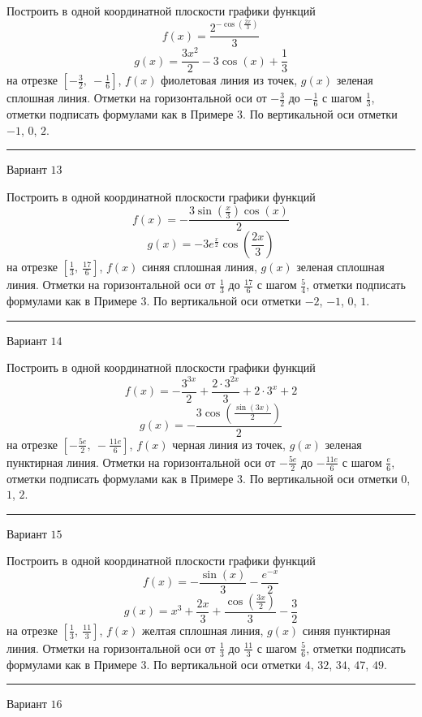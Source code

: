 \documentclass[11pt]{report}
\begin{document}
Построить в одной координатной плоскости графики функций $$f(x) = \frac{2^{- \cos{\left(\frac{2 x}{3} \right)}}}{3}$$ $$g(x) = \frac{3 x^{2}}{2} - 3 \cos{\left(x \right)} + \frac{1}{3}$$ на отрезке $\left[- \frac{3}{2}, \  - \frac{1}{6}\right]$, $f(x)$ фиолетовая линия из точек, $g(x)$ зеленая сплошная линия. Отметки на горизонтальной оси от $- \frac{3}{2}$ до $- \frac{1}{6}$ с шагом $\frac{1}{3}$, отметки подписать формулами как в Примере 3. По вертикальной оси отметки $-1$, $0$, $2$.
\begin{center}
\noindent\rule{8cm}{0.4pt}
\end{center}
Вариант $13$


Построить в одной координатной плоскости графики функций $$f(x) = - \frac{3 \sin{\left(\frac{x}{3} \right)} \cos{\left(x \right)}}{2}$$ $$g(x) = - 3 e^{\frac{x}{2}} \cos{\left(\frac{2 x}{3} \right)}$$ на отрезке $\left[\frac{1}{3}, \  \frac{17}{6}\right]$, $f(x)$ синяя сплошная линия, $g(x)$ зеленая сплошная линия. Отметки на горизонтальной оси от $\frac{1}{3}$ до $\frac{17}{6}$ с шагом $\frac{5}{4}$, отметки подписать формулами как в Примере 3. По вертикальной оси отметки $-2$, $-1$, $0$, $1$.
\begin{center}
\noindent\rule{8cm}{0.4pt}
\end{center}
Вариант $14$


Построить в одной координатной плоскости графики функций $$f(x) = - \frac{3^{3 x}}{2} + \frac{2 \cdot 3^{2 x}}{3} + 2 \cdot 3^{x} + 2$$ $$g(x) = - \frac{3 \cos{\left(\frac{\sin{\left(3 x \right)}}{2} \right)}}{2}$$ на отрезке $\left[- \frac{5 e}{2}, \  - \frac{11 e}{6}\right]$, $f(x)$ черная линия из точек, $g(x)$ зеленая пунктирная линия. Отметки на горизонтальной оси от $- \frac{5 e}{2}$ до $- \frac{11 e}{6}$ с шагом $\frac{e}{6}$, отметки подписать формулами как в Примере 3. По вертикальной оси отметки $0$, $1$, $2$.
\begin{center}
\noindent\rule{8cm}{0.4pt}
\end{center}
Вариант $15$


Построить в одной координатной плоскости графики функций $$f(x) = - \frac{\sin{\left(x \right)}}{3} - \frac{e^{- x}}{2}$$ $$g(x) = x^{3} + \frac{2 x}{3} + \frac{\cos{\left(\frac{3 x}{2} \right)}}{3} - \frac{3}{2}$$ на отрезке $\left[\frac{1}{3}, \  \frac{11}{3}\right]$, $f(x)$ желтая сплошная линия, $g(x)$ синяя пунктирная линия. Отметки на горизонтальной оси от $\frac{1}{3}$ до $\frac{11}{3}$ с шагом $\frac{5}{6}$, отметки подписать формулами как в Примере 3. По вертикальной оси отметки $4$, $32$, $34$, $47$, $49$.
\begin{center}
\noindent\rule{8cm}{0.4pt}
\end{center}
Вариант $16$
\end{document}
